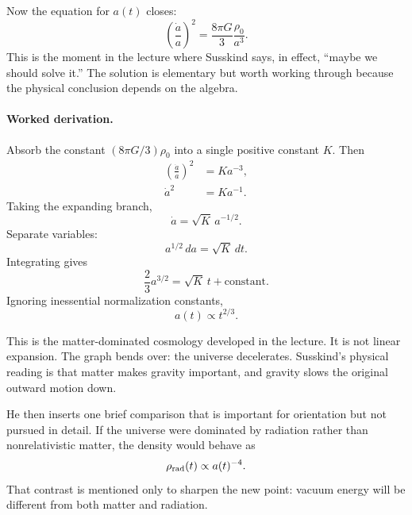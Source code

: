 Now the equation for \(a(t)\) closes:
\begin{equation}
\left(\frac{\dot a}{a}\right)^2=\frac{8\pi G}{3}\frac{\rho_0}{a^3}.
\end{equation}
This is the moment in the lecture where Susskind says, in effect, ``maybe we should solve it.'' The solution is elementary but worth working through because the physical conclusion depends on the algebra.

\paragraph{Worked derivation.}
Absorb the constant \((8\pi G/3)\rho_0\) into a single positive constant \(K\). Then
\begin{align}
\left(\frac{\dot a}{a}\right)^2&=K a^{-3},\\
\dot a^2&=K a^{-1}.
\end{align}
Taking the expanding branch,
\begin{equation}
\dot a=\sqrt{K}\,a^{-1/2}.
\end{equation}
Separate variables:
\begin{equation}
a^{1/2}\,da=\sqrt{K}\,dt.
\end{equation}
Integrating gives
\begin{equation}
\frac{2}{3}a^{3/2}=\sqrt{K}\,t+\text{constant}.
\end{equation}
Ignoring inessential normalization constants,
\begin{equation}
a(t)\propto t^{2/3}.
\end{equation}

This is the matter-dominated cosmology developed in the lecture. It is not linear expansion. The graph bends over: the universe decelerates. Susskind's physical reading is that matter makes gravity important, and gravity slows the original outward motion down.

He then inserts one brief comparison that is important for orientation but not pursued in detail. If the universe were dominated by radiation rather than nonrelativistic matter, the density would behave as
\begin{equation}
\rho_{\rm rad}(t)\propto a(t)^{-4}.
\end{equation}
That contrast is mentioned only to sharpen the new point: vacuum energy will be different from both matter and radiation.

